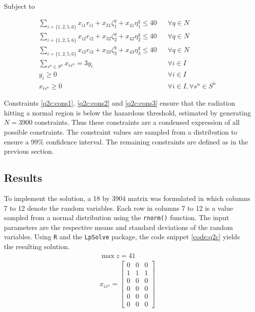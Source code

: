 \documentclass[a4paper,11pt]{article}
\begin{document}
Subject to

\begin{align}
\label{q2c:cons1}
	\sum_{i =\{1,2,5,6\}}x_{i1}r_{i1} +x_{31}\zeta_1^q+ x_{41}\eta_1^q\leq 40 && \forall q \in N\\
\label{q2c:cons2}
	\sum_{i =\{1,2,5,6\}}x_{i2}r_{i2} +x_{32}\zeta_2^q+ x_{42}\eta_2^q\leq 40 && \forall q \in N\\
\label{q2c:cons3}
	\sum_{i =\{1,2,5,6\}}x_{i3}r_{i3} +x_{33}\zeta_3^q+ x_{43}\eta_3^q\leq 40 && \forall q \in N\\
\label{q2c:cons4}
	\sum_{s^n \in S^n}x_{is^n}=3y_i &&  \forall i \in I \\
\label{q2c:cons5}
	 y_i \geq 0 && \forall i \in I\\
\label{q2c:cons6}
	 x_{is^n} \geq 0 && \forall i \in I,\forall s^n \in S^n 
\end{align}

Constraints \ref{q2c:cons1}, \ref{q2c:cons2} and \ref{q2c:cons3} ensure that the radiation hitting a normal region is below the hazardous threshold, estimated by generating $N=3900$ constraints. Thus these constraints are a condensed expression of all possible constraints. The constraint values are sampled from a distribution to ensure a 99\% confidence interval. The remaining constraints are defined as in the previous section.

\subsection{Results}

To implement the solution, a 18 by 3904 matrix was formulated in which columns 7 to 12 denote the random variables. Each row in columns 7 to 12 is a value sampled from a normal distribution using the \texttt{rnorm()} function. The input parameters are the respective means and standard deviations of the random variables. Using \texttt{R} and the \texttt{LpSolve} package, the code snippet \ref{code:q2c} yields the resulting solution.
\begin{align}
\max z = 41 \\
x_{is^n}=
	\begin{bmatrix}
    0  &  0  &  0 \\
    1  &  1  &  1 \\
    0  &  0  &  0 \\ 
    0  &  0  &  0 \\
    0  &  0  &  0 \\
    0  &  0  &  0
\end{bmatrix}
\end{align}
\end{document}
